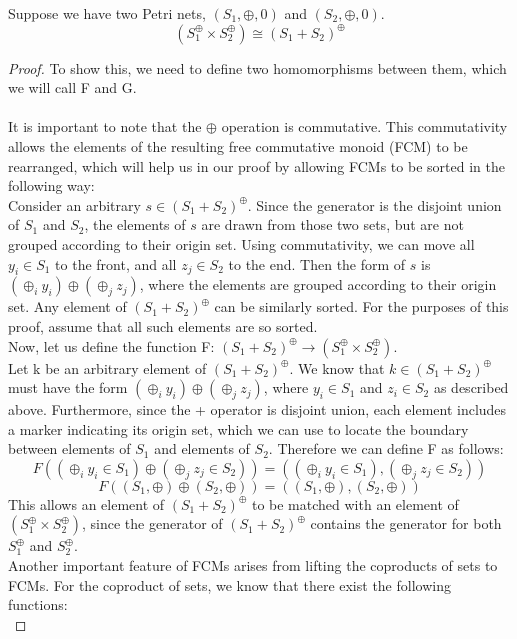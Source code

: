 \begin{lemma}
Suppose we have two Petri nets, $(S_1, \oplus, 0)$ and $(S_2, \oplus, 0)$.\\ 
\[(S_1 ^\oplus \times S_2 ^\oplus) \cong (S_1 + S_2)^\oplus\]
\begin{proof}
To show this, we need to define two homomorphisms between them, which we will call F and G.\\
\bigskip\\
It is important to note that the $\oplus$ operation is commutative. This commutativity allows the elements of the resulting free commutative monoid (FCM) to be rearranged, which will help us in our proof by allowing FCMs to be sorted in the following way:\bigskip\\
Consider an arbitrary $s \in (S_1 + S_2)^\oplus$. Since the generator is the disjoint union of $S_1$ and $S_2$, the elements of $s$ are drawn from those two sets, but are not grouped according to their origin set. Using commutativity, we can move all $y_i \in S_1$ to the front, and all $z_j \in S_2$ to the end. Then the form of $s$ is $(\oplus_i y_i) \oplus (\oplus_j z_j)$, where the elements are grouped according to their origin set. Any element of $(S_1 + S_2)^\oplus$ can be similarly sorted. For the purposes of this proof, assume that all such elements are so sorted.\bigskip \\
Now, let us define the function F: $(S_1 + S_2)^\oplus \rightarrow (S_1 ^\oplus \times S_2 ^\oplus)$.\\
Let k be an arbitrary element of $(S_1 + S_2)^\oplus$. We know that $k \in (S_1 + S_2)^\oplus$ must have the form $(\oplus_i y_i) \oplus (\oplus_j z_j)$, where $y_i \in S_1$ and $z_i \in S_2$ as described above. Furthermore, since the + operator is disjoint union, each element includes a marker indicating its origin set, which we can use to locate the boundary between elements of $S_1$ and elements of $S_2$. Therefore we can define F as follows:\\
\[F((\oplus_i y_i \in S_1) \oplus (\oplus_j z_j \in S_2)) = ((\oplus_i y_i \in S_1), (\oplus_j z_j \in S_2))\]
\[F((S_1, \oplus) \oplus (S_2, \oplus)) = ((S_1, \oplus), (S_2, \oplus))\]
This allows an element of $(S_1 + S_2)^\oplus$ to be matched with an element of $(S_1 ^\oplus \times S_2 ^\oplus)$, since the generator of $(S_1 + S_2)^\oplus$ contains the generator for both $S_1^\oplus$ and $S_2^\oplus$.\bigskip\\ 
Another important feature of FCMs arises from lifting the coproducts of sets to FCMs. For the coproduct of sets, we know that there exist the following functions:\\

\end{proof}
\end{lemma}
